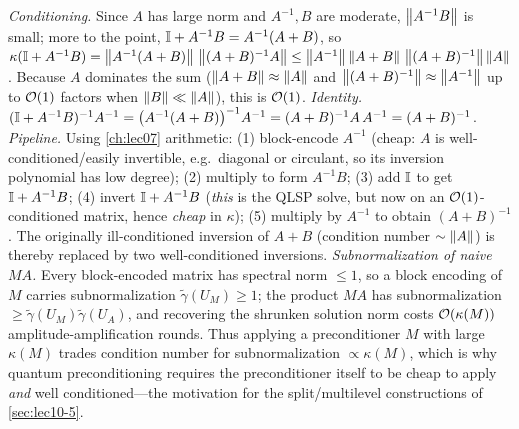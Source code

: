 \begin{solution}
\emph{Conditioning.} Since $A$ has large norm and $A^{-1},B$ are moderate,
$\left\lVert A^{-1}B \right\rVert$ is small; more to the point, $\mathbb{I}+A^{-1}B=A^{-1}(A+B)$, so
$\kappa(\mathbb{I}+A^{-1}B)=\left\lVert A^{-1}(A+B) \right\rVert\,\left\lVert (A+B)^{-1}A \right\rVert
\le\left\lVert A^{-1} \right\rVert\left\lVert A+B \right\rVert\,\left\lVert (A+B)^{-1} \right\rVert\left\lVert A \right\rVert$. Because $A$ dominates the sum
($\left\lVert A+B \right\rVert\approx\left\lVert A \right\rVert$ and $\left\lVert (A+B)^{-1} \right\rVert\approx\left\lVert A^{-1} \right\rVert$ up to $\mathcal{O}(1)$
factors when $\left\lVert B \right\rVert\ll\left\lVert A \right\rVert$), this is $\mathcal{O}(1)$. \emph{Identity.}
$(\mathbb{I}+A^{-1}B)^{-1}A^{-1}=\bigl(A^{-1}(A+B)\bigr)^{-1}A^{-1}=(A+B)^{-1}A\,A^{-1}
=(A+B)^{-1}$. \emph{Pipeline.} Using \cref{ch:lec07} arithmetic: (1) block-encode
$A^{-1}$ (cheap: $A$ is well-conditioned/easily invertible, e.g.\ diagonal or circulant,
so its inversion polynomial has low degree); (2) multiply to form $A^{-1}B$; (3) add
$\mathbb{I}$ to get $\mathbb{I}+A^{-1}B$; (4) invert $\mathbb{I}+A^{-1}B$ (\emph{this} is the QLSP solve, but
now on an $\mathcal{O}(1)$-conditioned matrix, hence \emph{cheap} in $\kappa$); (5) multiply by
$A^{-1}$ to obtain $(A+B)^{-1}$. The originally ill-conditioned inversion of $A+B$
(condition number $\sim\left\lVert A \right\rVert$) is thereby replaced by two well-conditioned inversions.
\emph{Subnormalization of naive $MA$.} Every block-encoded matrix has spectral norm
$\le1$, so a block encoding of $M$ carries subnormalization $\tilde\gamma(U_M)\ge1$;
the product $MA$ has subnormalization $\ge\tilde\gamma(U_M)\tilde\gamma(U_A)$, and
recovering the shrunken solution norm costs $\mathcal{O}(\kappa(M))$ amplitude-amplification
rounds. Thus applying a preconditioner $M$ with large $\kappa(M)$ trades condition
number for subnormalization $\propto\kappa(M)$, which is why quantum preconditioning
requires the preconditioner itself to be cheap to apply \emph{and} well conditioned---the
motivation for the split/multilevel constructions of \cref{sec:lec10-5}.
\end{solution}
